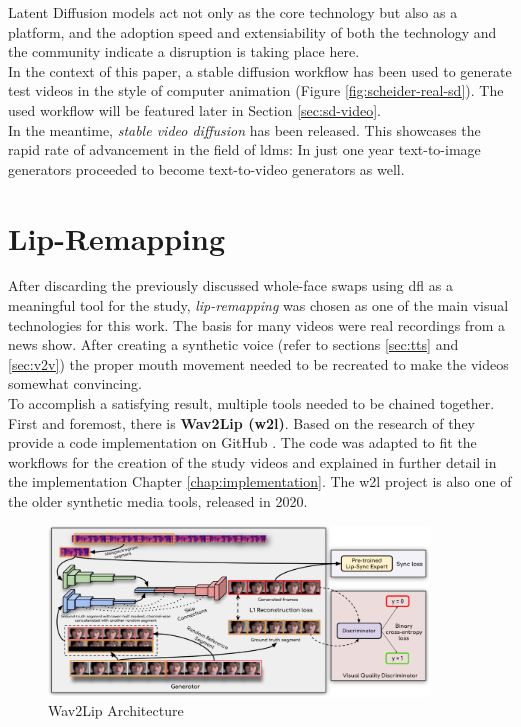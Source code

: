 \documentclass[
  a4paper,  %
  twoside,  %
  bibliography=totoc,
  headsepline,
  cleardoublepage=empty,
  parskip=half,
  draft=false
]{scrbook}
\begin{document}
Latent Diffusion models act not only as the core technology but also as a platform, and the adoption speed and extensiability of both the technology and the community indicate a disruption is taking place here. \\
In the context of this paper, a stable diffusion workflow has been used to generate test videos in the style of computer animation (Figure \ref{fig:scheider-real-sd}). The used workflow will be featured later in Section \ref{sec:sd-video}. \\
In the meantime, \textit{stable video diffusion} has been released. This showcases the rapid rate of advancement in the field of \gls{ldm}s: In just one year text-to-image generators proceeded to become text-to-video generators as well.


\section{Lip-Remapping}
\label{sec:lips}
After discarding the previously discussed whole-face swaps using \gls{dfl} as a meaningful tool for the study, \textit{lip-remapping} was chosen as one of the main visual technologies for this work. The basis for many videos were real recordings from a news show. After creating a synthetic voice (refer to sections \ref{sec:tts} and \ref{sec:v2v}) the proper mouth movement needed to be recreated to make the videos somewhat convincing. \\
To accomplish a satisfying result, multiple tools needed to be chained together. First and foremost, there is \textbf{Wav2Lip (\gls{w2l})}. Based on the research of \citet{prajwalLipSyncExpert2020} they provide a code implementation on GitHub \cite{mukhopadhyayWav2LipAccuratelyLipsyncing2023}. The code was adapted to fit the workflows for the creation of the study videos and explained in further detail in the implementation Chapter \ref{chap:implementation}. The \gls{w2l} project is also one of the older synthetic media tools, released in 2020.

\begin{figure}[h]
  \centering
  \includegraphics[width=0.9\textwidth]{./graphics/w2l-arch.png}
  \caption{Wav2Lip Architecture}
  \label{fig:wav2lip-arch}
\end{figure}
\end{document}
